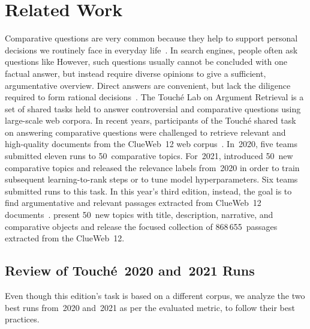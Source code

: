 \section{Related Work}

Comparative questions are very common because they help to support personal decisions we routinely face in everyday life~\cite{BondarenkoFBGAPBSWPH2020,BondarenkoGFBAPBSWPH2021,BondarenkoFKSGBPBSWPH2022}.
In search engines, people often ask questions like 
However, such questions usually cannot be concluded with one factual answer, but instead require diverse opinions to give a sufficient, argumentative overview.
Direct answers are convenient, but lack the diligence required to form rational decisions~\cite{BondarenkoFBGAPBSWPH2020,PotthastHS2020}.
The Touché Lab on Argument Retrieval is a set of shared tasks held to answer controversial and comparative questions using large-scale web corpora.
In recent years, participants of the Touché shared task on answering comparative questions were challenged to retrieve relevant and high-quality documents from the ClueWeb~12 web corpus~\cite{BondarenkoFBGAPBSWPH2020,BondarenkoGFBAPBSWPH2021,BondarenkoFKSGBPBSWPH2022}.
In~2020, five teams submitted eleven runs to 50~comparative topics.
For~2021, \citeauthor{BondarenkoGFBAPBSWPH2021} introduced 50~new comparative topics and released the relevance labels from~2020 in order to train subsequent learning-to-rank steps or to tune model hyperparameters.
Six teams submitted runs to this task.
In this year's third edition, instead, the goal is to find argumentative and relevant passages extracted from ClueWeb~12 documents~\cite{BondarenkoFKSGBPBSWPH2022}.
\citeauthor{BondarenkoFKSGBPBSWPH2022} present 50~new topics with title, description, narrative, and comparative objects and release the focused collection of 868\,655~passages extracted from the ClueWeb~12.

\subsection{Review of Touché~2020 and~2021 Runs}

Even though this edition's task is based on a different corpus, we analyze the two best runs from~2020 and~2021 as per the evaluated  metric, to follow their best practices.

